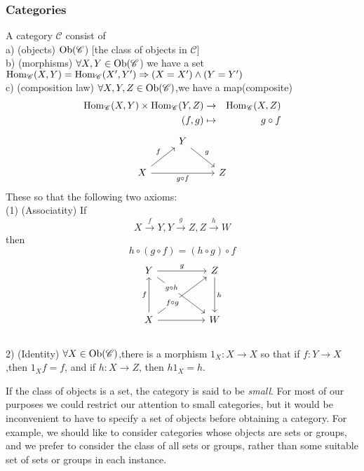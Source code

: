\documentclass{article}
\begin{document}
\subsubsection{Categories}
\begin{definition}
    A category $\mathscr{C}$ consist of\\
    a) (objects) $\operatorname{Ob}(\mathscr{C}$) [the class of objects in $\mathscr{C}$]\\
    b) (morphisms) $\forall X ,Y \in \operatorname{Ob}(\mathscr{C}$) we have a set $\operatorname{Hom}_{\mathscr{C}}(X,Y) = \operatorname{Hom}_\mathscr{C} (X',Y') \Rightarrow (X = X') \land (Y = Y')$\\
    c) (composition law) $\forall X,Y,Z\in \operatorname{Ob}(\mathscr{C})$,we have a map(composite)
    \begin{eqnarray*}
        \operatorname{Hom}_{\mathscr{C}}(X,Y) \times \operatorname{Hom}_{\mathscr{C}}(Y,Z) &\to& \operatorname{Hom}_{\mathscr{C}}(X,Z)\\
        (f,g) &\mapsto& g \circ f
    \end{eqnarray*} 
    \[\begin{tikzcd}
        & Y \\
        X && Z
        \arrow["{g \circ f}"', from=2-1, to=2-3]
        \arrow["f", from=2-1, to=1-2]
        \arrow["g", from=1-2, to=2-3]
    \end{tikzcd}\]
    These so that the following two axioms:\\
    (1) (Associatity) If 
    $$
    X \xrightarrow{f} Y , Y \xrightarrow{g} Z, Z \xrightarrow{h}W
    $$
    then
    $$
    h \circ (g \circ f) = (h \circ g) \circ f
    $$
    \[\begin{tikzcd}
        Y && Z \\
        \\
        X && W
        \arrow["f", from=3-1, to=1-1]
        \arrow["g", from=1-1, to=1-3]
        \arrow["h", from=1-3, to=3-3]
        \arrow[from=3-1, to=3-3]
        \arrow["{f \circ g}"{description, pos=0.3}, from=3-1, to=1-3]
        \arrow["{g \circ h}"{description, pos=0.3}, from=1-1, to=3-3]
    \end{tikzcd}\]\\
    2) (Identity) $\forall X \in \operatorname{Ob}(\mathscr{C})$,there is a morphism $1_X : X \to X$ so that if $f : Y \to X$,then $1_X f = f$, and if $h : X \to Z$, then $h1_X = h$.
\end{definition}
If the class of objects is a set, the category is said to be \emph{small}. For most of our purposes we could restrict our attention to small categories, but it would be inconvenient to have to specify a set of objects before obtaining a category. For example, we should like to consider categories whose objects are sets or groups, and we prefer to consider the class of all sets or groups, rather than some suitable set of sets or groups in each instance.\\
\end{document}
